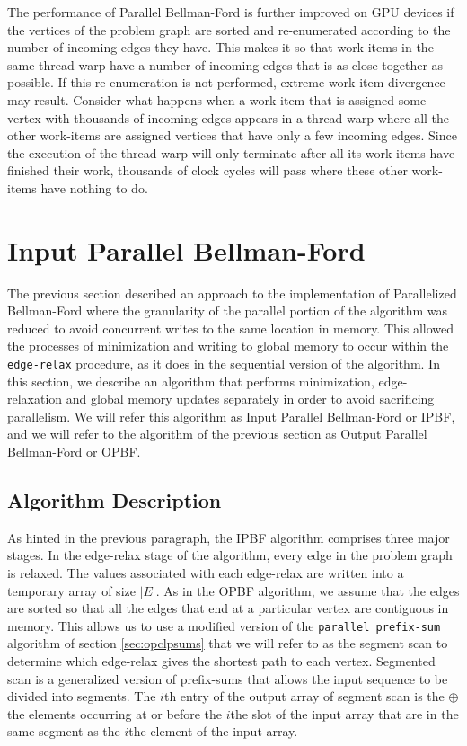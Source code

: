 \documentclass[12pt,twoside]{reedthesis}
\newcommand{\procedure}[1]{{\tt#1}}
\newcommand{\var}[1]{{\mbox{\tt#1}}}
\begin{document}
The performance of Parallel Bellman-Ford is further improved on GPU devices if the vertices of the problem graph are sorted and re-enumerated according to the number of incoming edges they have. This makes it so that work-items in the same thread warp have a number of incoming edges that is as close together as possible. If this re-enumeration is not performed, extreme work-item divergence may result. Consider what happens when a work-item that is assigned some vertex with thousands of incoming edges appears in a thread warp where all the other work-items are assigned vertices that have only a few incoming edges. Since the execution of the thread warp will only terminate after all its work-items have finished their work, thousands of clock cycles will pass where these other work-items have nothing to do.

\section{Input Parallel Bellman-Ford}

The previous section described an approach to the implementation of Parallelized Bellman-Ford where the granularity of the parallel portion of the algorithm was reduced to avoid concurrent writes to the same location in memory. This allowed the processes of minimization and writing to global memory to occur within the \var{edge-relax} procedure, as it does in the sequential version of the algorithm. In this section, we describe an algorithm that performs minimization, edge-relaxation and global memory updates separately in order to avoid sacrificing parallelism. We will refer this algorithm as Input Parallel Bellman-Ford or IPBF, and we will refer to the algorithm of the previous section as Output Parallel Bellman-Ford or OPBF.

\subsection{Algorithm Description}

As hinted in the previous paragraph, the IPBF algorithm comprises three major stages. In the edge-relax stage of the algorithm, every edge in the problem graph is relaxed. The values associated with each edge-relax are written into a temporary array of size $|E|$. As in the OPBF algorithm, we assume that the edges are sorted so that all the edges that end at a particular vertex are contiguous in memory. This allows us to use a modified version of the \procedure{parallel prefix-sum} algorithm of section \ref{sec:opclpsums} that we will refer to as the segment scan to determine which edge-relax gives the shortest path to each vertex. Segmented scan is a generalized version of prefix-sums that allows the input sequence to be divided into segments. The $i$th entry of the output array of segment scan is the $\oplus$ the elements occurring at or before the $i$the slot of the input array that are in the same segment as the $i$the element of the input array.
\end{document}
